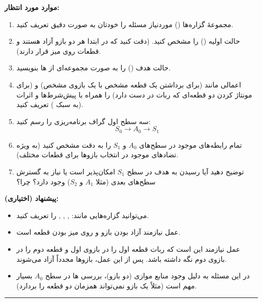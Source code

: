 \documentclass[a4paper,10pt]{article}
\begin{document}
	\vspace{1em}
	\textbf{موارد مورد انتظار:}
	\begin{enumerate}
		\item مجموعۀ گزاره‌ها () موردنیاز مسئله را خودتان به صورت دقیق تعریف کنید.
		\item حالت اولیه () را مشخص کنید. (دقت کنید که در ابتدا هر دو بازو آزاد هستند و قطعات روی میز قرار دارند).
		\item حالت هدف () را به صورت مجموعه‌ای از ها بنویسید.
		\item اعمالی مانند  (برای برداشتن یک قطعه مشخص با یک بازوی مشخص) و  (برای مونتاژ کردن دو قطعه‌ای که ربات در دست دارد) را همراه با پیش‌شرط‌ها و اثرات (به سبک ) تعریف کنید.
		\item سه سطح اول گراف برنامه‌ریزی را رسم کنید:
		\begin{equation*}
			S_0 \rightarrow A_0 \rightarrow S_1
		\end{equation*}
		\item تمام رابطه‌های  موجود در سطح‌های $A_0$ و $S_1$ را به دقت مشخص کنید (به ویژه تضادهای موجود در انتخاب بازوها برای قطعات مختلف).
		\item توضیح دهید آیا رسیدن به هدف در سطح $S_1$ امکان‌پذیر است یا نیاز به گسترش سطح‌های بعدی (مثلا $A_1$ و $S_2$) وجود دارد؟ چرا؟
	\end{enumerate}
	
	\vspace{1em}
	\textbf{پیشنهاد (اختیاری):}
	\begin{itemize}
		\item می‌توانید گزاره‌هایی مانند:
		, , ,  
		را تعریف کنید.
		\item عمل  نیازمند آزاد بودن بازو و روی میز بودن قطعه است.
		\item عمل  نیازمند این است که ربات قطعه اول را در بازوی اول و قطعه دوم را در بازوی دوم نگه داشته باشد. پس از این عمل، بازوها مجدداً آزاد می‌شوند.
		\item در این مسئله به دلیل وجود منابع موازی (دو بازو)، بررسی ها در سطح $A_0$ بسیار مهم است (مثلاً یک بازو نمی‌تواند همزمان دو قطعه را بردارد).
	\end{itemize}
	
	\bigskip
	\bigskip
	\textcolor{AccentCyan}{\rule{\linewidth}{0.4pt}}
	
\end{document}
